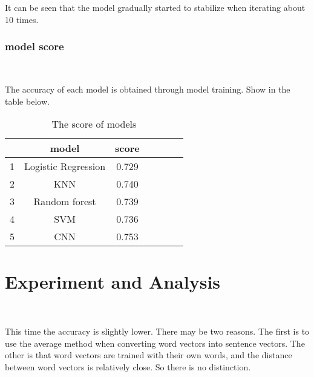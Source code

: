  It can be seen that the model gradually started to stabilize when iterating about 10 times.

 \subsubsection{model score}
 \

 The accuracy of each model is obtained through model training. Show in the table below.
 \
 
 \begin{table}[htbp]  \centering
    \caption{The score of models}
    \label{tbl:data information}
    \begin{tabular}{ccccccc}
      \hline
        & model          & score \\
      \hline
      1 &  Logistic Regression  & 0.729  \\
      2 &  KNN                  & 0.740  \\
      3 &  Random forest        & 0.739  \\
      4 &  SVM                  & 0.736  \\
      5 &  CNN                  & 0.753  \\
      \hline 
    \end{tabular}
  \end{table}







\section{Experiment and Analysis}
\

This time the accuracy is slightly lower. There may be two reasons. The first is to use the average method 
when converting word vectors into sentence vectors. The other is that word vectors are trained with their own words,
 and the distance between word vectors is relatively close. So there is no distinction.

